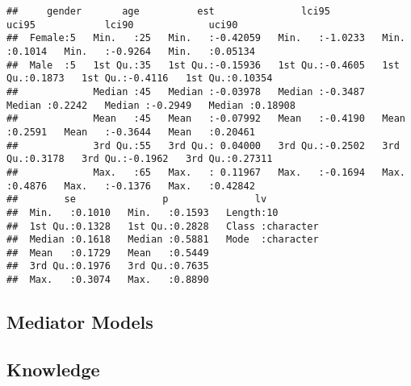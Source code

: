 \documentclass[
]{article}
\begin{document}
\begin{verbatim}
##     gender       age          est               lci95             uci95            lci90             uci90        
##  Female:5   Min.   :25   Min.   :-0.42059   Min.   :-1.0233   Min.   :0.1014   Min.   :-0.9264   Min.   :0.05134  
##  Male  :5   1st Qu.:35   1st Qu.:-0.15936   1st Qu.:-0.4605   1st Qu.:0.1873   1st Qu.:-0.4116   1st Qu.:0.10354  
##             Median :45   Median :-0.03978   Median :-0.3487   Median :0.2242   Median :-0.2949   Median :0.18908  
##             Mean   :45   Mean   :-0.07992   Mean   :-0.4190   Mean   :0.2591   Mean   :-0.3644   Mean   :0.20461  
##             3rd Qu.:55   3rd Qu.: 0.04000   3rd Qu.:-0.2502   3rd Qu.:0.3178   3rd Qu.:-0.1962   3rd Qu.:0.27311  
##             Max.   :65   Max.   : 0.11967   Max.   :-0.1694   Max.   :0.4876   Max.   :-0.1376   Max.   :0.42842  
##        se               p               lv           
##  Min.   :0.1010   Min.   :0.1593   Length:10         
##  1st Qu.:0.1328   1st Qu.:0.2828   Class :character  
##  Median :0.1618   Median :0.5881   Mode  :character  
##  Mean   :0.1729   Mean   :0.5449                     
##  3rd Qu.:0.1976   3rd Qu.:0.7635                     
##  Max.   :0.3074   Max.   :0.8890
\end{verbatim}

\hypertarget{mediator-models-4}{%
\subsection{Mediator Models}\label{mediator-models-4}}

\hypertarget{knowledge-4}{%
\subsection{Knowledge}\label{knowledge-4}}
\end{document}
